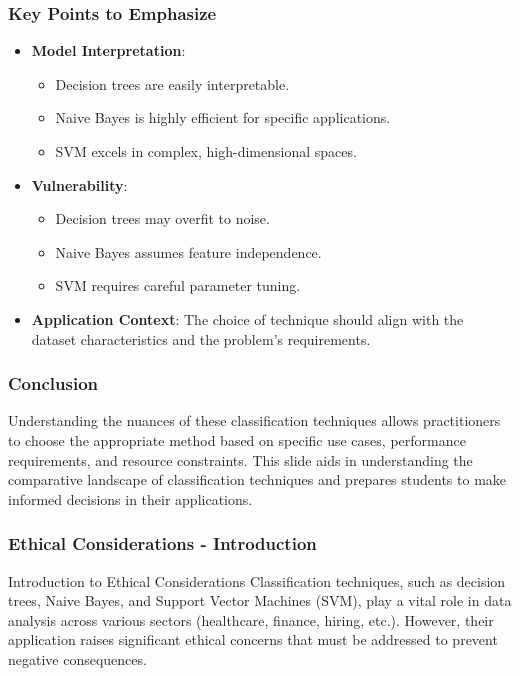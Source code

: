 \documentclass[aspectratio=169]{beamer}
\begin{document}
\begin{frame}[fragile]
    \frametitle{Key Points to Emphasize}
    \begin{itemize}
        \item \textbf{Model Interpretation}: 
            \begin{itemize}
                \item Decision trees are easily interpretable.
                \item Naive Bayes is highly efficient for specific applications.
                \item SVM excels in complex, high-dimensional spaces.
            \end{itemize}
        \item \textbf{Vulnerability}: 
            \begin{itemize}
                \item Decision trees may overfit to noise.
                \item Naive Bayes assumes feature independence.
                \item SVM requires careful parameter tuning.
            \end{itemize}
        \item \textbf{Application Context}: 
            The choice of technique should align with the dataset characteristics and the problem's requirements.
    \end{itemize}
\end{frame}

\begin{frame}[fragile]
    \frametitle{Conclusion}
    Understanding the nuances of these classification techniques allows practitioners to choose the appropriate method based on specific use cases, performance requirements, and resource constraints. This slide aids in understanding the comparative landscape of classification techniques and prepares students to make informed decisions in their applications.
\end{frame}

\begin{frame}[fragile]
    \frametitle{Ethical Considerations - Introduction}
    \begin{block}{Introduction to Ethical Considerations}
        Classification techniques, such as decision trees, Naive Bayes, and Support Vector Machines (SVM), play a vital role in data analysis across various sectors (healthcare, finance, hiring, etc.). However, their application raises significant ethical concerns that must be addressed to prevent negative consequences.
    \end{block}
\end{frame}
\end{document}
